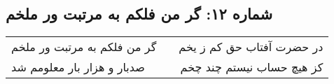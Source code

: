 \begin{center}
\section*{شماره ۱۲: گر من فلکم به مرتبت ور ملخم}
\label{sec:012}
\begin{longtable}{l p{0.5cm} r}
گر من فلکم به مرتبت ور ملخم
&&
در حضرت آفتاب حق کم ز یخم
\\
صدبار و هزار بار معلومم شد
&&
کز هیچ حساب نیستم چند چخم
\\
\end{longtable}
\end{center}
